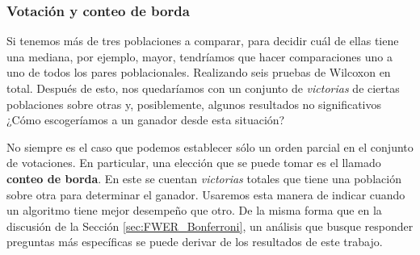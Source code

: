 


\subsubsection{Votación y conteo de borda} \label{sec:Votacion}

Si tenemos más de tres poblaciones a comparar, para decidir cuál de ellas tiene una mediana, por ejemplo, mayor, tendríamos que hacer comparaciones uno a uno de todos los pares poblacionales. Realizando seis pruebas de Wilcoxon en total. Después de esto, nos quedaríamos con un conjunto de \emph{victorias} de ciertas poblaciones sobre otras y, posiblemente, algunos resultados no significativos ¿Cómo escogeríamos a un ganador desde esta situación?

No siempre es el caso que podemos establecer sólo un orden parcial en el conjunto de votaciones. En particular, una elección que se puede tomar es el llamado \textbf{conteo de borda}. En este se cuentan \emph{victorias} totales que tiene una población sobre otra para determinar el ganador. Usaremos esta manera de indicar cuando un algoritmo tiene mejor desempeño que otro. De la misma forma que en la discusión de la Sección \ref{sec:FWER_Bonferroni}, un análisis que busque responder preguntas más específicas se puede derivar de los resultados de este trabajo. 









